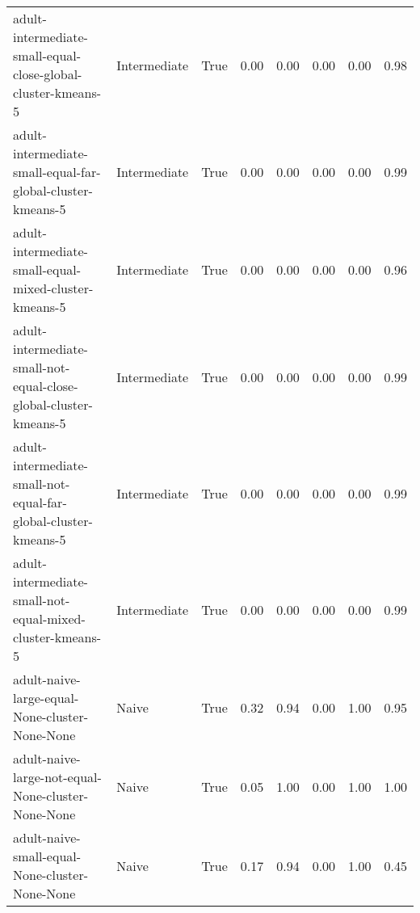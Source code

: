 \begin{longtable}{llllllll}
                           adult-intermediate-small-equal-close-global-cluster-kmeans-5 & Intermediate &        True &                 0.00 &                 0.00 &                         0.00 &                         0.00 &                         0.98 \\
                             adult-intermediate-small-equal-far-global-cluster-kmeans-5 & Intermediate &        True &                 0.00 &                 0.00 &                         0.00 &                         0.00 &                         0.99 \\
                                  adult-intermediate-small-equal-mixed-cluster-kmeans-5 & Intermediate &        True &                 0.00 &                 0.00 &                         0.00 &                         0.00 &                         0.96 \\
                       adult-intermediate-small-not-equal-close-global-cluster-kmeans-5 & Intermediate &        True &                 0.00 &                 0.00 &                         0.00 &                         0.00 &                         0.99 \\
                         adult-intermediate-small-not-equal-far-global-cluster-kmeans-5 & Intermediate &        True &                 0.00 &                 0.00 &                         0.00 &                         0.00 &                         0.99 \\
                              adult-intermediate-small-not-equal-mixed-cluster-kmeans-5 & Intermediate &        True &                 0.00 &                 0.00 &                         0.00 &                         0.00 &                         0.99 \\
                                         adult-naive-large-equal-None-cluster-None-None &        Naive &        True &                 0.32 &                 0.94 &                         0.00 &                         1.00 &                         0.95 \\
                                     adult-naive-large-not-equal-None-cluster-None-None &        Naive &        True &                 0.05 &                 1.00 &                         0.00 &                         1.00 &                         1.00 \\
                                         adult-naive-small-equal-None-cluster-None-None &        Naive &        True &                 0.17 &                 0.94 &                         0.00 &                         1.00 &                         0.45 \\

\end{longtable}
